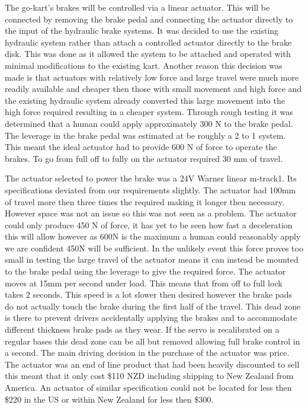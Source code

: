 The go-kart's brakes will be controlled via a linear actuator. This will be
connected by removing the brake pedal and connecting the actuator directly to
the input of the hydraulic brake systems. It was decided to use the existing
hydraulic system rather than attach a controlled actuator directly to the brake
disk. This was done as it allowed the system to be attached and operated with
minimal modifications to the existing kart. Another reason this decision was
made is that actuators with relatively low force and large travel were much more
readily available and cheaper then those with small movement and high force and
the existing hydraulic system already converted this large movement into the
high force required resulting in a cheaper system. Through rough testing it was
determined that a human could apply approximately 300 N to the brake pedal. The
leverage in the brake pedal was estimated at be roughly a 2 to 1 system. This
meant the ideal actuator had to provide 600 N of force to operate the brakes. To
go from full off to fully on the actuator required 30 mm of travel.

The actuator selected to power the brake was a 24V Warner linear m-track1. Its
specifications deviated from our requirements slightly. The actuator had 100mm
of travel more then three times the required making it longer then necessary.
However space was not an issue so this was not seen as a problem. The actuator
could only produce 450 N of force, it has yet to be seen how fast a deceleration
this will allow however as 600N is the maximum a human could reasonably apply we
are confident 450N will be sufficient. In the unlikely event this force proves
too small in testing the large travel of the actuator means it can instead be
mounted to the brake pedal using the leverage to give the required force. The
actuator moves at 15mm per second under load. This means that from off to full
lock takes 2 seconds. This speed is a lot slower then desired however the brake
pads do not actually touch the brake during the first half of the travel. This
dead zone is there to prevent drivers accidentally applying the brakes and to
accommodate different thickness brake pads as they wear. If the servo is
recalibrated on a regular bases this dead zone can be all but removed allowing
full brake control in a second. The main driving decision in the purchase of the
actuator was price. The actuator was an end of line product that had been
heavily discounted to sell this meant that it only cost \$110 NZD including
shipping to New Zealand from America. An actuator of similar specification could
not be located for less then \$220 in the US or within New Zealand for less then
\$300.

